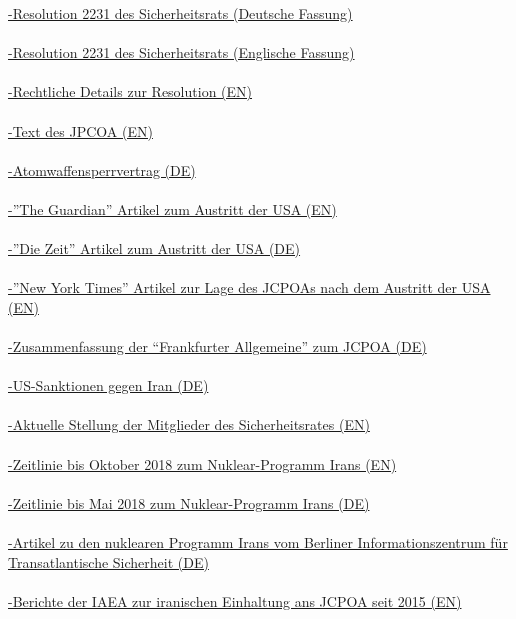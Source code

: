 \documentclass[a4paper,11pt]{article}
\begin{document}
\href{http://www.un.org/depts/german/sr/sr_15/sr2231.pdf}{-Resolution 2231 des Sicherheitsrats (Deutsche Fassung)} \\ \\ \href{https://www.securitycouncilreport.org/atf/cf/\%7B65BFCF9B-6D27-4E9C-8CD3-CF6E4FF96FF9\%7D/s_res_2231.pdf}{-Resolution 2231 des Sicherheitsrats (Englische Fassung)} \\ \\ \href{https://fas.org/sgp/crs/nuke/LSB10134.pdf}{-Rechtliche Details zur Resolution (EN)} \\ \\ \href{https://www.state.gov/documents/organization/245317.pdf}{-Text des JPCOA (EN)} \\ \\ \href{https://www.auswaertiges-amt.de/blob/207392/b38bbdba4ef59ede2fec9e91f2a8179b/nvv-data.pdf}{-Atomwaffensperrvertrag (DE)} \\ \\ \href{https://www.theguardian.com/world/live/2018/may/08/iran-nuclear-deal-donald-trump-latest-live-updates}{-''The Guardian'' Artikel zum Austritt der USA (EN)} \\ \\ \href{https://www.zeit.de/politik/ausland/2018-05/iran-donald-trump-kuendigt-ausstieg-aus-atomabkommen-an}{-''Die Zeit'' Artikel zum Austritt der USA (DE)} \\ \\ \href{https://www.nytimes.com/interactive/2018/05/07/world/middleeast/iran-deal-before-after.html}{-''New York Times'' Artikel zur Lage des JCPOAs nach dem Austritt der USA (EN)} \\ \\ \href{http://www.faz.net/aktuell/politik/ausland/einigung-mit-iran-zusammenfassung-des-atomabkommens-13702441.html}{-Zusammenfassung der “Frankfurter Allgemeine” zum JCPOA (DE)} \\ \\ \href{https://www.wko.at/service/aussenwirtschaft/USA-setzt-Iran-Sanktionen-wieder-in-Kraft.html}{-US-Sanktionen gegen Iran (DE)} \\ \\ \href{https://www.un.org/press/en/2018/sc13398.doc.htm}{-Aktuelle Stellung der Mitglieder des Sicherheitsrates (EN)} \\ \\ \href{https://www.armscontrol.org/factsheet/Timeline-of-Nuclear-Diplomacy-With-Iran}{-Zeitlinie bis Oktober 2018 zum Nuklear-Programm Irans (EN)} \\ \\ \href{https://www.mdr.de/nachrichten/politik/ausland/chronologie-atomstreit-mit-iran-100.html}{-Zeitlinie bis Mai 2018 zum Nuklear-Programm Irans (DE)} \\ \\ \href{http://www.bits.de/public/pdf/rr06-1.pdf}{-Artikel zu den nuklearen Programm Irans vom Berliner Informationszentrum für Transatlantische Sicherheit (DE)} \\ \\ \href{https://www.iaea.org/newscenter/focus/iran/iaea-and-iran-iaea-reports}{-Berichte der IAEA zur iranischen Einhaltung ans JCPOA seit 2015 (EN)}
 
\end{document}
